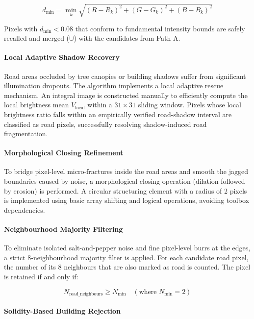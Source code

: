 \documentclass[12pt,a4paper]{ctexart}
\begin{document}
\[
d_{\min} = \min_{k} \sqrt{(R - R_k)^2 + (G - G_k)^2 + (B - B_k)^2}
\]

Pixels with $d_{\min} < 0.08$ that conform to fundamental intensity bounds are safely recalled and merged ($\cup$) with the candidates from Path A.

\paragraph{Local Adaptive Shadow Recovery}

Road areas occluded by tree canopies or building shadows suffer from significant illumination dropouts. The algorithm implements a local adaptive rescue mechanism. An integral image is constructed manually to efficiently compute the local brightness mean $V_{\text{local}}$ within a $31 \times 31$ sliding window. Pixels whose local brightness ratio falls within an empirically verified road-shadow interval are classified as road pixels, successfully resolving shadow-induced road fragmentation.

\paragraph{Morphological Closing Refinement}

To bridge pixel-level micro-fractures inside the road areas and smooth the jagged boundaries caused by noise, a morphological closing operation (dilation followed by erosion) is performed. A circular structuring element with a radius of 2 pixels is implemented using basic array shifting and logical operations, avoiding toolbox dependencies.

\paragraph{Neighbourhood Majority Filtering}

To eliminate isolated salt-and-pepper noise and fine pixel-level burrs at the edges, a strict 8-neighbourhood majority filter is applied. For each candidate road pixel, the number of its 8 neighbours that are also marked as road is counted. The pixel is retained if and only if:

\[
N_{\text{road\_neighbours}} \ge N_{\min} \quad (\text{where } N_{\min} = 2)
\]

\paragraph{Solidity-Based Building Rejection}
\end{document}
